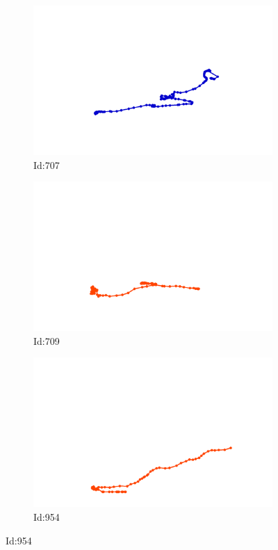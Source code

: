 \documentclass[12pt,twoside]{report}
\begin{document}
\begin{figure}
\centering
\begin{subfigure}[b]{0.20\textwidth}
\centering
\includegraphics[width=\textwidth]{../../trajectories/707.png}
\caption{Id:707}
\end{subfigure}
\begin{subfigure}[b]{0.20\textwidth}
\centering
\includegraphics[width=\textwidth]{../../trajectories/709.png}
\caption{Id:709}
\end{subfigure}
\begin{subfigure}[b]{0.20\textwidth}
\centering
\includegraphics[width=\textwidth]{../../trajectories/954.png}
\caption{Id:954}
\end{subfigure}
\end{figure}
\end{document}
